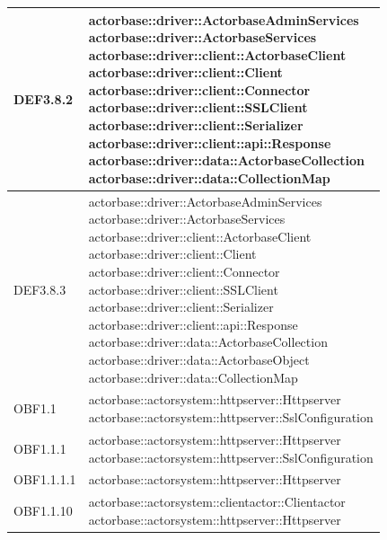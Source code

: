 \documentclass{scalatekids-article}
\begin{document}
\begin{longtable}[H]{|p{5cm}|p{12cm}|}
\hline
DEF3.8.2 & \multiLineCell[t]{actorbase::driver::ActorbaseAdminServices\\actorbase::driver::ActorbaseServices\\actorbase::driver::client::ActorbaseClient\\actorbase::driver::client::Client\\actorbase::driver::client::Connector\\actorbase::driver::client::SSLClient\\actorbase::driver::client::Serializer\\actorbase::driver::client::api::Response\\actorbase::driver::data::ActorbaseCollection\\actorbase::driver::data::CollectionMap\\}\\
\hline
DEF3.8.3 & \multiLineCell[t]{actorbase::driver::ActorbaseAdminServices\\actorbase::driver::ActorbaseServices\\actorbase::driver::client::ActorbaseClient\\actorbase::driver::client::Client\\actorbase::driver::client::Connector\\actorbase::driver::client::SSLClient\\actorbase::driver::client::Serializer\\actorbase::driver::client::api::Response\\actorbase::driver::data::ActorbaseCollection\\actorbase::driver::data::ActorbaseObject\\actorbase::driver::data::CollectionMap\\}\\
\hline
OBF1.1 & \multiLineCell[t]{actorbase::actorsystem::httpserver::Httpserver\\actorbase::actorsystem::httpserver::SslConfiguration\\}\\
\hline
OBF1.1.1 & \multiLineCell[t]{actorbase::actorsystem::httpserver::Httpserver\\actorbase::actorsystem::httpserver::SslConfiguration\\}\\
\hline
OBF1.1.1.1 & \multiLineCell[t]{actorbase::actorsystem::httpserver::Httpserver\\}\\
\hline
OBF1.1.10 & \multiLineCell[t]{actorbase::actorsystem::clientactor::Clientactor\\actorbase::actorsystem::httpserver::Httpserver\\}\\

\end{longtable}
\end{document}
